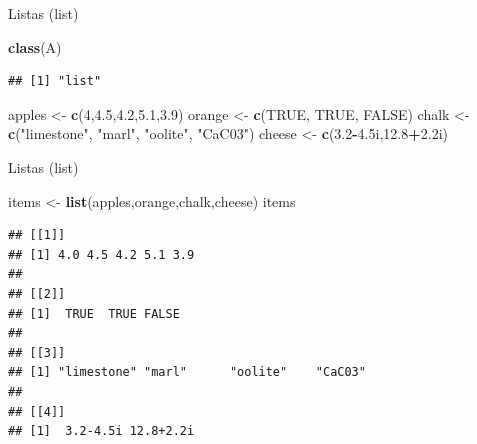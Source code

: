 \documentclass[ignorenonframetext,]{beamer}
\newenvironment{Shaded}{\begin{snugshade}}{\end{snugshade}}
\newcommand{\KeywordTok}[1]{\textcolor[rgb]{0.13,0.29,0.53}{\textbf{#1}}}
\newcommand{\DecValTok}[1]{\textcolor[rgb]{0.00,0.00,0.81}{#1}}
\newcommand{\FloatTok}[1]{\textcolor[rgb]{0.00,0.00,0.81}{#1}}
\newcommand{\StringTok}[1]{\textcolor[rgb]{0.31,0.60,0.02}{#1}}
\newcommand{\OtherTok}[1]{\textcolor[rgb]{0.56,0.35,0.01}{#1}}
\newcommand{\OperatorTok}[1]{\textcolor[rgb]{0.81,0.36,0.00}{\textbf{#1}}}
\newcommand{\NormalTok}[1]{#1}
\begin{document}
\begin{frame}[fragile]{Listas (list)}

\begin{Shaded}
\begin{Highlighting}[]
\KeywordTok{class}\NormalTok{(A)}
\end{Highlighting}
\end{Shaded}

\begin{verbatim}
## [1] "list"
\end{verbatim}

\begin{Shaded}
\begin{Highlighting}[]
\NormalTok{apples <-}\StringTok{ }\KeywordTok{c}\NormalTok{(}\DecValTok{4}\NormalTok{,}\FloatTok{4.5}\NormalTok{,}\FloatTok{4.2}\NormalTok{,}\FloatTok{5.1}\NormalTok{,}\FloatTok{3.9}\NormalTok{)}
\NormalTok{orange <-}\StringTok{ }\KeywordTok{c}\NormalTok{(}\OtherTok{TRUE}\NormalTok{, }\OtherTok{TRUE}\NormalTok{, }\OtherTok{FALSE}\NormalTok{)}
\NormalTok{chalk <-}\StringTok{ }\KeywordTok{c}\NormalTok{(}\StringTok{"limestone"}\NormalTok{, }\StringTok{"marl"}\NormalTok{, }\StringTok{"oolite"}\NormalTok{, }\StringTok{"CaC03"}\NormalTok{)}
\NormalTok{cheese <-}\StringTok{ }\KeywordTok{c}\NormalTok{(}\FloatTok{3.2}\OperatorTok{-}\FloatTok{4.}\NormalTok{5i,}\FloatTok{12.8}\OperatorTok{+}\FloatTok{2.}\NormalTok{2i)}
\end{Highlighting}
\end{Shaded}

\end{frame}

\begin{frame}[fragile]{Listas (list)}

\begin{Shaded}
\begin{Highlighting}[]
\NormalTok{items <-}\StringTok{ }\KeywordTok{list}\NormalTok{(apples,orange,chalk,cheese)}
\NormalTok{items}
\end{Highlighting}
\end{Shaded}

\begin{verbatim}
## [[1]]
## [1] 4.0 4.5 4.2 5.1 3.9
## 
## [[2]]
## [1]  TRUE  TRUE FALSE
## 
## [[3]]
## [1] "limestone" "marl"      "oolite"    "CaC03"    
## 
## [[4]]
## [1]  3.2-4.5i 12.8+2.2i
\end{verbatim}

\end{frame}
\end{document}
